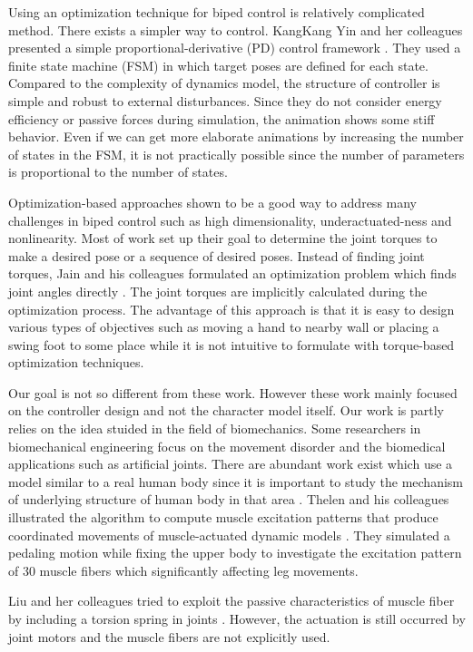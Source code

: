 \documentclass[master,english,final]{kaist-ucs}
\begin{document}
Using an optimization technique for biped control is relatively complicated method.
There exists a simpler way to control. KangKang Yin and her colleagues
presented a simple proportional-derivative (PD) control framework \cite{journals/tog/YinLP07}.
They used a finite state machine (FSM) in which target poses are defined
for each state. Compared to the complexity of dynamics model,
the structure of controller is simple and robust to external disturbances.
Since they do not consider energy efficiency or passive forces during
simulation, the animation shows some stiff behavior.
Even if we can get more elaborate animations by increasing
the number of states in the FSM, it is not practically possible since the
number of parameters is proportional to the number of states.

Optimization-based approaches shown to be a good way to address many challenges
in biped control such as high dimensionality, underactuated-ness and
nonlinearity. Most of work set up their goal to determine the joint
torques to make a desired pose or a sequence of desired poses.
Instead of finding joint torques, Jain and his colleagues formulated
an optimization problem which finds joint angles directly \cite{Jain:09:OIM}. The joint torques
are implicitly calculated during the optimization process. The advantage of
this approach is that it is easy to design various types of objectives such as
moving a hand to nearby wall or placing a swing foot to some place while it
is not intuitive to formulate with torque-based optimization techniques.


Our goal is not so different from these work. However these work mainly focused
on the controller design and not the character model itself. Our work is
partly relies on the idea stuided in the field of biomechanics.
Some researchers in biomechanical engineering focus on the movement
disorder and the biomedical applications such as artificial joints.
There are abundant work exist which use a model similar to
a real human body since it is important to study the mechanism of underlying
structure of human body in that area \cite{vr-305}. Thelen and his colleagues
illustrated
the algorithm to compute muscle excitation patterns that produce
coordinated movements of muscle-actuated dynamic models \cite{Thelen2003321}.
They simulated
a pedaling motion while fixing the upper body to investigate the excitation
pattern of 30 muscle fibers which significantly affecting leg movements.

Liu and her colleagues tried to exploit the passive characteristics of
muscle fiber by including a torsion spring in joints \cite{Liu:2005:LPB}.
However, the actuation
is still occurred by joint motors and the muscle fibers are not explicitly used.
\end{document}

